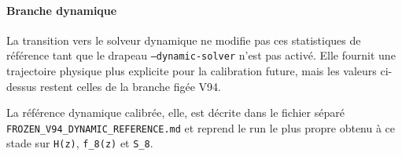 \paragraph{Branche dynamique}
La transition vers le solveur dynamique ne modifie pas ces statistiques de référence tant que le drapeau \texttt{--dynamic-solver} n'est pas activé. Elle fournit une trajectoire physique plus explicite pour la calibration future, mais les valeurs ci-dessus restent celles de la branche figée V94.

La référence dynamique calibrée, elle, est décrite dans le fichier séparé \texttt{FROZEN\_V94\_DYNAMIC\_REFERENCE.md} et reprend le run le plus propre obtenu à ce stade sur \texttt{H(z)}, \texttt{f\sigma\_8(z)} et \texttt{S\_8}.


